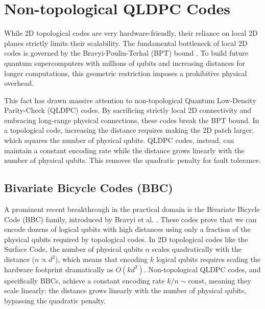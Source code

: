 \section{Non-topological QLDPC Codes}

 While 2D topological codes are very hardware-friendly, their reliance on local 2D planes strictly limits their scalability. The fundamental bottleneck of local 2D codes is governed by the Bravyi-Poulin-Terhal (BPT) bound \cite{Bravyi_2010}. To build future quantum supercomputers with millions of qubits and increasing distances for longer computations, this geometric restriction imposes a prohibitive physical overhead.

This fact has drawn massive attention to non-topological Quantum Low-Density Parity-Check (QLDPC) codes. By sacrificing strictly local 2D connectivity and embracing long-range physical connections, these codes break the BPT bound. In a topological code, increasing the distance requires making the 2D patch larger, which squares the number of physical qubits. QLDPC codes, instead, can maintain a constant encoding rate while the distance grows linearly with the number of physical qubits. This removes the quadratic penalty for fault tolerance.

\subsection{Bivariate Bicycle Codes (BBC)}

A prominent recent breakthrough in the practical domain is the Bivariate Bicycle Code (BBC) family, introduced by Bravyi et al. \cite{bravyi2024high}. These codes prove that we can encode dozens of logical qubits with high distances using only a fraction of the physical qubits required by topological codes. In 2D topological codes like the Surface Code, the number of physical qubits $n$ scales quadratically with the distance ($n \propto d^2$), which means that encoding $k$ logical qubits requires scaling the hardware footprint dramatically as $O(k d^2)$. Non-topological QLDPC codes, and specifically BBCs, achieve a constant encoding rate $k/n \sim \text{const}$, meaning they scale linearly: the distance grows linearly with the number of physical qubits, bypassing the quadratic penalty.

